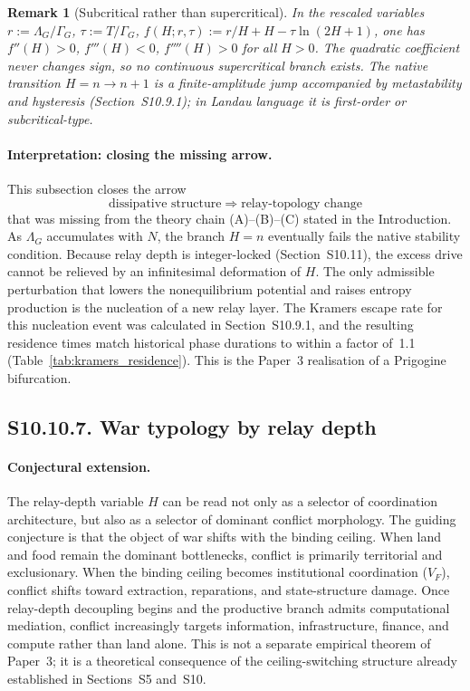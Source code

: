 \documentclass[11pt]{article}
\newtheorem{remark}{Remark}
\begin{document}
\begin{remark}[Subcritical rather than supercritical]
\label{rmk:subcritical}
In the rescaled variables $r:=\Lambda_G/\Gamma_G$, $\tau:=T/\Gamma_G$,
$f(H;r,\tau):=r/H+H-\tau\ln(2H+1)$,
one has $f''(H)>0$, $f'''(H)<0$, $f''''(H)>0$ for all $H>0$.
The quadratic coefficient never changes sign, so no continuous supercritical
branch exists.
The native transition $H=n\to n+1$ is a finite-amplitude jump accompanied
by metastability and hysteresis (Section~S10.9.1);
in Landau language it is first-order or subcritical-type.
\end{remark}

\paragraph{Interpretation: closing the missing arrow.}
This subsection closes the arrow
\[
\text{dissipative structure} \;\Longrightarrow\; \text{relay-topology change}
\]
that was missing from the theory chain (A)--(B)--(C) stated in the
Introduction.
As $\Lambda_G$ accumulates with $N$, the branch $H=n$ eventually fails the
native stability condition.
Because relay depth is integer-locked (Section~S10.11), the excess drive
cannot be relieved by an infinitesimal deformation of $H$.
The only admissible perturbation that lowers the nonequilibrium potential and
raises entropy production is the nucleation of a new relay layer.
The Kramers escape rate for this nucleation event was calculated in
Section~S10.9.1, and the resulting residence times match historical phase
durations to within a factor of~1.1 (Table~\ref{tab:kramers_residence}).
This is the Paper~3 realisation of a Prigogine bifurcation.


\subsection*{S10.10.7. War typology by relay depth}
\label{sec:S10_10_7_war_typology}

\paragraph{Conjectural extension.}
The relay-depth variable $H$ can be read not only as a selector of
coordination architecture, but also as a selector of dominant conflict
morphology.  The guiding conjecture is that the object of war shifts
with the binding ceiling.  When land and food remain the dominant
bottlenecks, conflict is primarily territorial and exclusionary.  When
the binding ceiling becomes institutional coordination ($V_F$), conflict
shifts toward extraction, reparations, and state-structure damage.
Once relay-depth decoupling begins and the productive branch admits
computational mediation, conflict increasingly targets information,
infrastructure, finance, and compute rather than land alone.
This is not a separate empirical theorem of Paper~3; it is a
theoretical consequence of the ceiling-switching structure already
established in Sections~S5 and~S10.
\end{document}
